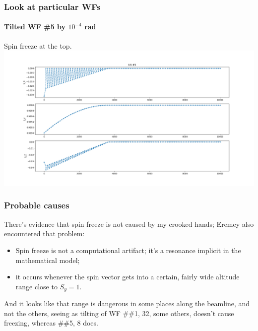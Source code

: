 \documentclass[pdf]{beamer}
\begin{document}
\begin{frame}\frametitle{Look at particular WFs}
\framesubtitle{Tilted WF \#5 by $10^{-4}$ rad}
	Spin freeze at the top.
	\centering
	\includegraphics[scale=.3]{freeze/TITLS_TEST_5thWF_1e-4rad}
\end{frame}
\begin{frame}
	\frametitle{Probable causes}
	There's evidence that spin freeze is not caused by my crooked hands; Eremey also encountered that problem:
	\begin{itemize}
		\item Spin freeze is not a computational artifact; it's a resonance implicit in the mathematical model;
		\item it occurs whenever the spin vector gets into a certain, fairly wide altitude range close to $S_y = 1$.
	\end{itemize}
	And it looks like that range is dangerous in some places along the beamline, and not the others, seeing as tilting of WF \#\#1, 32, some others, doesn't cause freezing, whereas \#\#5, 8 does.
\end{frame}
\end{document}
